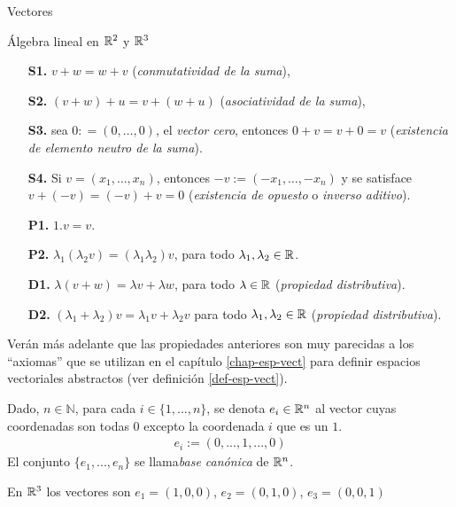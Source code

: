 \begin{chapter}{Vectores}
\begin{section}{\'Algebra lineal en $\mathbb R^2$ y $\mathbb R^3$}
    \begin{enumerate}
        \item[\textbf{S1.}] $v + w = w + v$ (\textit{conmutatividad de la suma}),
        \item[\textbf{S2.}] $(v+ w)+ u = v + (w+u)$ (\textit{asociatividad de la suma}),
        \item[\textbf{S3.}] sea $0: =(0,\ldots, 0)$, el \textit{vector cero}, entonces $0+ v = v + 0 =v$ (\textit{existencia de elemento neutro de la suma}).
        \item[\textbf{S4.}] Si $v =(x_1,\ldots,x_n)$, entonces $-v:=(-x_1,\ldots,-x_n)$ y se satisface  $v + (-v) = (-v)+ v =0$ (\textit{existencia de opuesto} o  \textit{inverso aditivo}).
        \item[\textbf{P1.}] $1.v=v$.
        \item[\textbf{P2.}] $\lambda_1(\lambda_2v) = (\lambda_1\lambda_2)v$, para todo $\lambda_1,\lambda_2 \in \mathbb R$.
        \item[\textbf{D1.}] $\lambda(v+w) = \lambda v +\lambda w$, para todo $\lambda \in \mathbb R$  (\textit{propiedad distributiva}).
        \item[\textbf{D2.}] $(\lambda_1+\lambda_2)v = \lambda_1v + \lambda_2 v$ para todo $\lambda_1,\lambda_2 \in \mathbb R$  (\textit{propiedad distributiva}).
    \end{enumerate}





Verán más adelante que las propiedades anteriores son muy parecidas a los  ``axiomas'' que se utilizan en el  capítulo \ref{chap-esp-vect} para definir espacios vectoriales abstractos (ver definición \ref{def-esp-vect}). 



    \begin{definicion}\label{def-base-canonica-rn}
    Dado, $n \in \mathbb N$, para cada $i\in\{1, ..., n\}$, se denota ${e_i}\in\mathbb R^n$ al vector cuyas coordenadas son todas $0$ excepto la coordenada $i$ que es un $1$.
    \begin{align*}
    e_i:=(0, ..., 1, ..., 0)
    \end{align*}
    El conjunto $\{e_1, ..., e_n\}$ se llama\textit{ {base canónica}} de $\mathbb R^n$.
\end{definicion}

\begin{ejemplo*}
    En $\mathbb R^3$ los vectores son $
    e_1=(1,0,0)$, $
    e_2=(0,1,0)$, 
    $e_3=(0,0,1)
    $
\end{ejemplo*}


\end{section}
\end{chapter}
